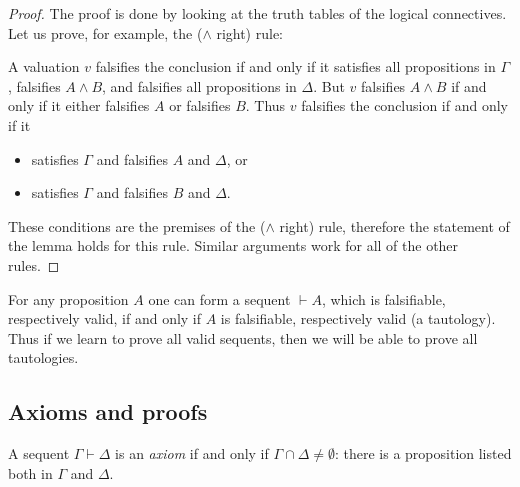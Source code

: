 \begin{page}
\setcounter{section}{2}
\setcounter{subsection}{5}
\setcounter{dfn}{9}
\label{portion:445}

\begin{proof}
The proof is done by looking at the truth tables of the logical connectives.
Let us prove, for example, the ($\wedge$ right) rule:
\begin{prooftree}
\end{prooftree}
A valuation $v$ falsifies the conclusion if and only if
it satisfies all propositions in $\Gamma$, falsifies $A \wedge B$, and falsifies all propositions in $\Delta$.
But $v$ falsifies $A \wedge B$ if and only if it either falsifies $A$ or falsifies $B$.
Thus $v$ falsifies the conclusion if and only if it
\begin{itemize}
\item
satisfies $\Gamma$ and falsifies $A$ and $\Delta$, or
\item
satisfies $\Gamma$ and falsifies $B$ and $\Delta$.
\end{itemize}
These conditions are the premises of the ($\wedge$ right) rule, therefore the statement of the lemma holds for this rule.
Similar arguments work for all of the other rules.
\end{proof}

For any proposition $A$ one can form a sequent $\vdash A$, which is falsifiable, respectively valid, if and only if
$A$ is falsifiable, respectively valid (a tautology).
Thus if we learn to prove all valid sequents, then we will be able to prove all tautologies.




\end{page}

\begin{page}
\setcounter{section}{2}
\setcounter{subsection}{5}
\setcounter{dfn}{9}
\label{portion:446}

\subsection{Axioms and proofs}
\label{sec:AxiomsProofs}

\end{page}

\begin{page}
\setcounter{section}{2}
\setcounter{subsection}{5}
\setcounter{dfn}{10}
\label{portion:448}

\begin{dfn}
A sequent $\Gamma \vdash \Delta$ is an \emph{axiom} if and only if $\Gamma \cap \Delta \ne \emptyset$:
there is a proposition listed both in $\Gamma$ and $\Delta$.
\end{dfn}

\end{page}

